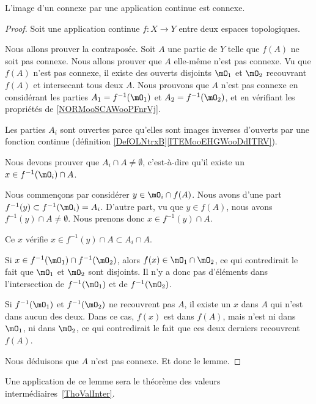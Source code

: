 \begin{lemma}   \label{LemConncontconn}
	L'image d'un connexe par une application continue est connexe.
\end{lemma}

\begin{proof}
	Soit une application continue \(f \colon X\to Y  \) entre deux espaces topologiques.

	Nous allons prouver la contraposée. Soit \( A\) une partie de \( Y\) telle que \( f(A)\) ne soit pas connexe. Nous allons prouver que \( A\) elle-même n'est pas connexe. Vu que \( f(A)\) n'est pas connexe, il existe des ouverts disjoints \( \mO_1\) et \( \mO_2\) recouvrant \( f(A)\) et intersecant tous deux \( A\). Nous prouvons que \( A\) n'est pas connexe en considérant les parties  \( A_1=f^{-1}(\mO_1)\) et \( A_2=f^{-1}(\mO_2)\), et en vérifiant les propriétés de \ref{NORMooSCAWooPFnrVj}.

	\begin{subproof}
		Les parties \( A_i\) sont ouvertes parce qu'elles sont images inverses d'ouverts par une fonction continue (définition \ref{DefOLNtrxB}\ref{ITEMooEHGWooDdITRV}).

		Nous devons prouver que \( A_i\cap A\neq \emptyset\), c'est-à-dire qu'il existe un \( x\in f^{-1}(\mO_i)\cap A\).

		Nous commençons par considérer \( y\in \mO_i\cap f(A)\). Nous avons d'une part \( f^{-1}(y)\subset f^{-1}(\mO_i)=A_i\). D'autre part, vu que \( y\in f(A)\), nous avons \( f^{-1}(y)\cap A\neq \emptyset\). Nous prenons donc \( x\in f^{-1}(y)\cap A\).

		Ce \( x\) vérifie \( x\in f^{-1}(y)\cap A\subset A_i\cap A\).

		Si \( x\in f^{-1}(\mO_1)\cap f^{-1}(\mO_2)\), alors \( f(x)\in \mO_1\cap\mO_2\), ce qui contredirait le fait que \( \mO_1\) et \( \mO_2\) sont disjoints. Il n'y a donc pas d'éléments dans l'intersection de \( f^{-1}(\mO_1)\) et de \( f^{-1}(\mO_2)\).

		Si \( f^{-1}(\mO_1)\) et \( f^{-1}(\mO_2)\) ne recouvrent pas \( A\), il existe un \( x\) dans \( A\) qui n'est dans aucun des deux. Dans ce cas, \( f(x)\) est dans \( f(A)\), mais n'est ni dans \( \mO_1\), ni dans \( \mO_2\), ce qui contredirait le fait que ces deux derniers recouvrent \( f(A)\).
	\end{subproof}
	Nous déduisons que \( A\) n'est pas connexe. Et donc le lemme.
\end{proof}
Une application de ce lemme sera le théorème des valeurs intermédiaires~\ref{ThoValInter}.

